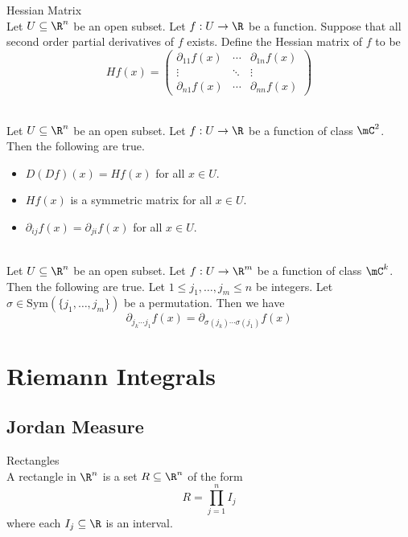 \documentclass[a4paper]{article}
\begin{document}
\begin{defn}{Hessian Matrix}{}\\
Let $U\subseteq\R^n$ be an open subset. Let $f:U\to\R$ be a function. Suppose that all second order partial derivatives of $f$ exists. Define the Hessian matrix of $f$ to be $$Hf(x)=\begin{pmatrix}
\partial_{11}f(x) & \cdots & \partial_{1n}f(x)\\
\vdots & \ddots & \vdots\\
\partial_{n1}f(x) & \cdots & \partial_{nn}f(x)
\end{pmatrix}$$
\end{defn}

\begin{prp}{}{}\\
Let $U\subseteq\R^n$ be an open subset. Let $f:U\to\R$ be a function of class $\mC^2$. Then the following are true. 
\begin{itemize}
\item $D(Df)(x)=Hf(x)$ for all $x\in U$. 
\item $Hf(x)$ is a symmetric matrix for all $x\in U$. 
\item $\partial_{ij}f(x)=\partial_{ji}f(x)$ for all $x\in U$. 
\end{itemize}
\end{prp}

\begin{prp}{}{}\\
Let $U\subseteq\R^n$ be an open subset. Let $f:U\to\R^m$ be a function of class $\mC^k$. Then the following are true. Let $1\leq j_1,\dots,j_m\leq n$ be integers. Let $\sigma\in\text{Sym}(\{j_1,\dots,j_m\})$ be a permutation. Then we have $$\partial_{j_k\cdots j_1}f(x)=\partial_{\sigma(j_k)\cdots\sigma(j_1)}f(x)$$
\end{prp}

\pagebreak
\section{Riemann Integrals}
\subsection{Jordan Measure}
\begin{defn}{Rectangles}{}\\
A rectangle in $\R^n$ is a set $R\subseteq\R^n$ of the form $$R=\prod_{j=1}^nI_j$$ where each $I_j\subseteq\R$ is an interval. 
\end{defn}
\end{document}
